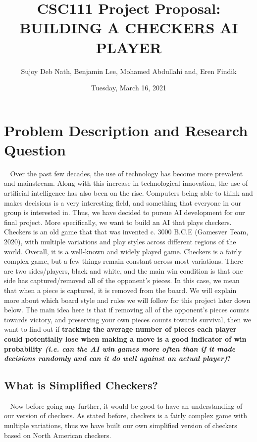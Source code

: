 \documentclass[fontsize=11pt]{article}
\title{CSC111 Project Proposal: BUILDING A CHECKERS AI PLAYER}
\author{Sujoy Deb Nath, Benjamin Lee, Mohamed Abdullahi and, Eren Findik}
\date{Tuesday, March 16, 2021}
\begin{document}
\maketitle

\section*{Problem Description and Research Question}

$~~~~$Over the past few decades, the use of technology has become more prevalent and mainstream. Along with this increase in technological innovation, the use of artificial intelligence has also been on the rise. Computers being able to think and makes decisions is a very interesting field, and something that everyone in our group is interested in. Thus, we have decided to pursue AI development for our final project. More specifically, we want to build an AI that plays checkers. \\

Checkers is an old game that that was invented c. 3000 B.C.E (Gamesver Team, 2020), with multiple variations and play styles across different regions of the world. Overall, it is a well-known and widely played game. Checkers is a fairly complex game, but a few things remain constant across most variations. There are two sides/players, black and white, and the main win condition is that one side has captured/removed all of the opponent’s pieces. In this case, we mean that when a piece is captured, it is removed from the board. We will explain more about which board style and rules we will follow for this project later down below. The main idea here is that if removing all of the opponent’s pieces counts towards victory, and preserving your own pieces counts towards survival, then we want to find out if \textbf{tracking the average number of pieces each player could potentially lose when making a move is a good indicator of win probability \textsl{(i.e. can the AI win games more often than if it made decisions randomly and can it do well against an actual player)}?}

\subsection*{What is Simplified Checkers?}

$~~~~$Now before going any further, it would be good to have an understanding of our version of checkers. As stated before, checkers is a fairly complex game with multiple variations, thus we have built our own simplified version of checkers based on North American checkers. \\
\end{document}
